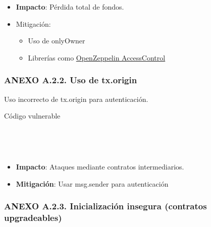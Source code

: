 \begin{itemize}
\tightlist
\item
  \textbf{Impacto}: Pérdida total de fondos.
\item
  Mitigación:

  \begin{itemize}
  \tightlist
  \item
    Uso de onlyOwner
  \item
    Librerías como
    \href{https://docs.openzeppelin.com/contracts/5.x/access-control}{OpenZeppelin
    AccessControl}
  \end{itemize}
\end{itemize}

\subsubsection{ANEXO A.2.2. Uso de
tx.origin}\label{anexo-a.2.2.-uso-de-tx.origin}

Uso incorrecto de tx.origin para autenticación.

Código vulnerable

\begin{Shaded}
\begin{Highlighting}[]
 \NormalTok{() }\NormalTok{ \{}

     \OperatorTok{==}\OperatorTok{;}

    \NormalTok{)}\NormalTok{(}\NormalTok{(}\NormalTok{)}\NormalTok{)}\OperatorTok{;}

\NormalTok{\}}
\end{Highlighting}
\end{Shaded}

\begin{itemize}
\tightlist
\item
  \textbf{Impacto}: Ataques mediante contratos intermediarios.
\item
  \textbf{Mitigación}: Usar msg.sender para autenticación
\end{itemize}

\subsubsection{ANEXO A.2.3. Inicialización insegura (contratos
upgradeables)}\label{anexo-a.2.3.-inicializaciuxf3n-insegura-contratos-upgradeables}

